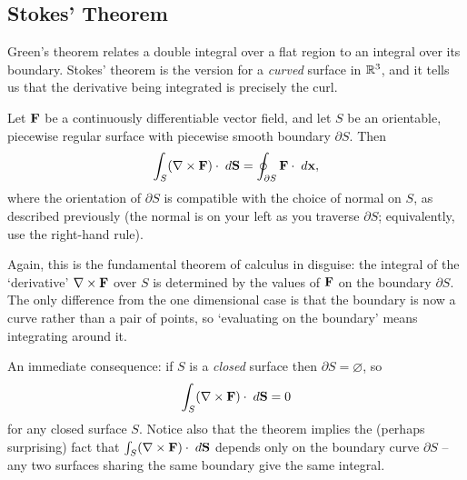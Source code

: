 \documentclass[a4paper]{scrartcl}
\begin{document}
\subsection{Stokes' Theorem}

Green's theorem relates a double integral over a flat region to an integral over its boundary. Stokes' theorem is the version for a \emph{curved} surface in $\mathbb{R}^3$, and it tells us that the derivative being integrated is precisely the curl.

\begin{theorem}
	Let $\mathbf{F}$ be a continuously differentiable vector field, and let $S$ be an orientable, piecewise regular surface with piecewise smooth boundary $\partial S$. Then
	$$
	\int_S (\nabla \times \mathbf{F}) \cdot \; d \mathbf{S} = \oint_{\partial S} \mathbf{F} \cdot \; d \mathbf{x},
	$$
	where the orientation of $\partial S$ is compatible with the choice of normal on $S$, as described previously (the normal is on your left as you traverse $\partial S$; equivalently, use the right-hand rule).
\end{theorem}

Again, this is the fundamental theorem of calculus in disguise: the integral of the `derivative' $\nabla \times \mathbf{F}$ over $S$ is determined by the values of $\mathbf{F}$ on the boundary $\partial S$. The only difference from the one dimensional case is that the boundary is now a curve rather than a pair of points, so `evaluating on the boundary' means integrating around it.

An immediate consequence: if $S$ is a \emph{closed} surface then $\partial S = \varnothing$, so
$$
\int_S (\nabla \times \mathbf{F}) \cdot \; d \mathbf{S} = 0
$$
for any closed surface $S$. Notice also that the theorem implies the (perhaps surprising) fact that $\int_S (\nabla \times \mathbf{F}) \cdot \; d \mathbf{S}$ depends only on the boundary curve $\partial S$ -- any two surfaces sharing the same boundary give the same integral.
\end{document}
